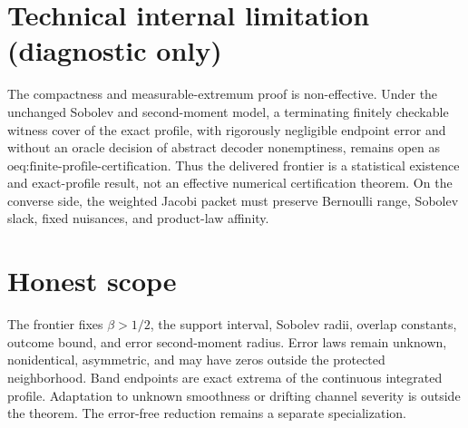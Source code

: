 \documentclass{article}
\begin{document}
\section*{Technical internal limitation (diagnostic only)}

The compactness and measurable-extremum proof is non-effective. Under the unchanged Sobolev and second-moment model, a terminating finitely checkable witness cover of the exact profile, with rigorously negligible endpoint error and without an oracle decision of abstract decoder nonemptiness, remains open as \(\text{oeq:finite-profile-certification}\). Thus the delivered frontier is a statistical existence and exact-profile result, not an effective numerical certification theorem. On the converse side, the weighted Jacobi packet must preserve Bernoulli range, Sobolev slack, fixed nuisances, and product-law affinity.

\section{Honest scope}

The frontier fixes \(\beta>1/2\), the support interval, Sobolev radii, overlap constants, outcome bound, and error second-moment radius. Error laws remain unknown, nonidentical, asymmetric, and may have zeros outside the protected neighborhood. Band endpoints are exact extrema of the continuous integrated profile. Adaptation to unknown smoothness or drifting channel severity is outside the theorem. The error-free reduction remains a separate specialization.
\end{document}
